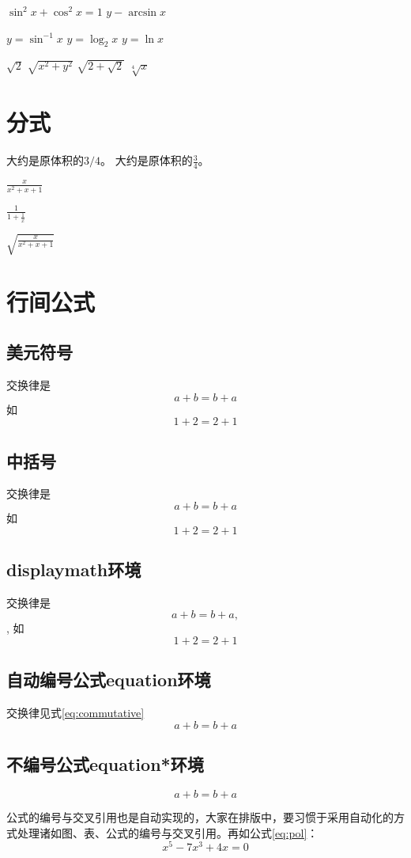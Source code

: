 \documentclass{ctexart}%
\begin{document}
	$\sin^2 x +\cos^2 x =1$
	$y - \arcsin x$
	
	$y = \sin^{-1} x$
	$y = \log_2 x$
	$y = \ln x$
	
	$\sqrt{2}$
	$\sqrt{x^2 + y^2}$
	$\sqrt{2 + \sqrt{2}}$
	$\sqrt[4]{x}$   %
	
	\section{分式}
	大约是原体积的$3/4$。
	大约是原体积的$\frac{3}{4}$。
	
	$\frac{x}{x^2 + x + 1}$
	
	$\frac{1}{1 + \frac{1}{x}}$
	
	$\sqrt{\frac{x}{x^2 + x +1}}$
	
	\section{行间公式}
	\subsection{美元符号}
	交换律是 
	$$a+b=b+a$$
	如
	 $$1+2=2+1$$
	
	\subsection{中括号}
	交换律是 
	\[a+b=b+a\]
	如
	\[1+2=2+1\]
	
	\subsection{displaymath环境}
	交换律是 
	\begin{displaymath}
		a+b=b+a,
	\end{displaymath},
	如
	\begin{displaymath}
		1+2=2+1
	\end{displaymath}
	
	\subsection{自动编号公式equation环境}
	交换律见式\ref{eq:commutative}
	\begin{equation}
		a+b=b+a \label{eq:commutative} %
	\end{equation}
	
	\subsection{不编号公式equation*环境}
	\begin{equation*}
	a+b=b+a %
	\end{equation*}

	公式的编号与交叉引用也是自动实现的，大家在排版中，要习惯于采用自动化的方式处理诸如图、表、公式的编号与交叉引用。再如公式\ref{eq:pol}：
	\begin{equation}
		x^5 -7x^3 + 4x = 0 \label{eq:pol}
	\end{equation}
	
\end{document}
